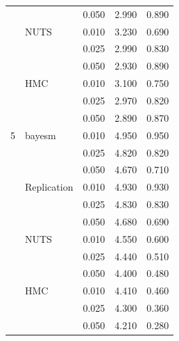 \begin{longtable}{clccc}
 &  & 0.050 & 2.990 & 0.890 \\
 & NUTS & 0.010 & 3.230 & 0.690 \\
 &  & 0.025 & 2.990 & 0.830 \\
 &  & 0.050 & 2.930 & 0.890 \\
 & HMC & 0.010 & 3.100 & 0.750 \\
 &  & 0.025 & 2.970 & 0.820 \\
 &  & 0.050 & 2.890 & 0.870 \\
5 & bayesm & 0.010 & 4.950 & 0.950 \\
 &  & 0.025 & 4.820 & 0.820 \\
 &  & 0.050 & 4.670 & 0.710 \\
 & Replication & 0.010 & 4.930 & 0.930 \\
 &  & 0.025 & 4.830 & 0.830 \\
 &  & 0.050 & 4.680 & 0.690 \\
 & NUTS & 0.010 & 4.550 & 0.600 \\
 &  & 0.025 & 4.440 & 0.510 \\
 &  & 0.050 & 4.400 & 0.480 \\
 & HMC & 0.010 & 4.410 & 0.460 \\
 &  & 0.025 & 4.300 & 0.360 \\
 &  & 0.050 & 4.210 & 0.280 \\
\end{longtable}
